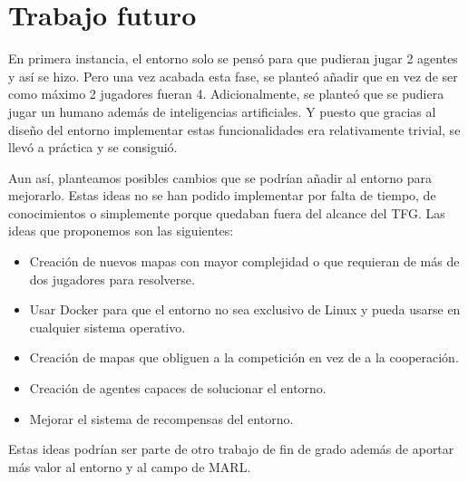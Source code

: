 \section{Trabajo futuro}

En primera instancia, el entorno solo se pensó para que pudieran jugar 2 agentes y así se hizo. Pero una vez acabada esta fase, se planteó añadir que en vez de ser como máximo 2 jugadores fueran 4. Adicionalmente, se planteó que se pudiera jugar un humano además de inteligencias artificiales. Y puesto que gracias al diseño del entorno implementar estas funcionalidades era relativamente trivial, se llevó a práctica y se consiguió.

Aun así, planteamos posibles cambios que se podrían añadir al entorno para mejorarlo. Estas ideas no se han podido implementar por falta de tiempo, de conocimientos o simplemente porque quedaban fuera del alcance del TFG. Las ideas que proponemos son las siguientes:

\begin{itemize}
    \item Creación de nuevos mapas con mayor complejidad o que requieran de más de dos jugadores para resolverse.
    \item Usar Docker para que el entorno no sea exclusivo de Linux y pueda usarse en cualquier sistema operativo.
    \item Creación de mapas que obliguen a la competición en vez de a la cooperación.
    \item Creación de agentes capaces de solucionar el entorno.
    \item Mejorar el sistema de recompensas del entorno.
\end{itemize}

Estas ideas podrían ser parte de otro trabajo de fin de grado además de aportar más valor al entorno y al campo de MARL.